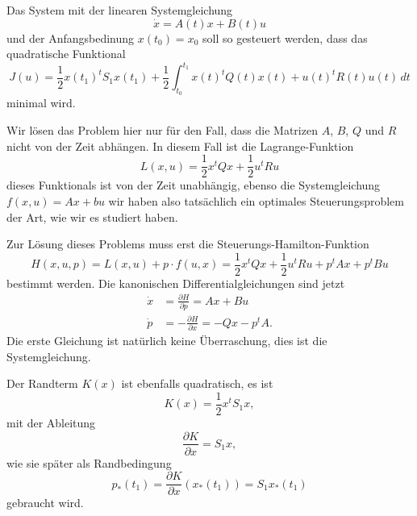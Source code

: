 \begin{aufgabe}
\label{buch:hamiltonjacobi:oc:aufgabe:lqc}
Das System mit der linearen Systemgleichung
\begin{equation}
\dot{x}
=
A(t)x
+
B(t)u
\end{equation}
und der Anfangsbedinung $x(t_0)=x_0$ soll so gesteuert werden,
dass das quadratische Funktional
\begin{equation}
J(u)
=
\frac12 x(t_1)^t S_1 x(t_1)
+
\frac12
\int_{t_0}^{t_1}
x(t)^t Q(t) x(t)
+
u(t)^t R(t) u(t)
\,dt
\end{equation}
minimal wird.
\end{aufgabe}
Wir lösen das Problem hier nur für den Fall, dass die Matrizen $A$, $B$,
$Q$ und $R$ nicht von der Zeit abhängen.
In diesem Fall ist die Lagrange-Funktion
\[
L(x,u)
=
\frac12 x^t Qx + \frac12 u^t Ru
\]
dieses Funktionals ist von der Zeit unabhängig,
ebenso die Systemgleichung $f(x,u)=Ax+bu$ wir haben also tatsächlich ein
optimales Steuerungsproblem der Art, wie wir es studiert haben.

Zur Lösung dieses Problems muss erst die Steuerungs-Hamilton-Funktion
\[
H(x,u,p)
=
L(x,u) + p\cdot f(u,x)
=
\frac12 x^tQx + \frac12 u^tRu + p^tAx + p^tBu
\]
bestimmt werden.
Die kanonischen Differentialgleichungen sind jetzt
\begin{align*}
\dot{x}
&=
\frac{\partial H}{\partial p}
=
Ax
+
Bu
\\
\dot{p}
&=
-\frac{\partial H}{\partial x}
=
-Qx - p^tA.
\end{align*}
Die erste Gleichung ist natürlich keine Überraschung, dies ist die
Systemgleichung.

Der Randterm $K(x)$ ist ebenfalls quadratisch, es ist
\[
K(x) = \frac12 x^t S_1 x,
\]
mit der Ableitung
\begin{equation*}
\frac{\partial K}{\partial x}
=
S_1x,
\end{equation*}
wie sie später als Randbedingung
\[
p_*(t_1)
=
\frac{\partial K}{\partial x}(x_*(t_1))
=
S_1x_*(t_1)
\]
gebraucht wird.

%
%
